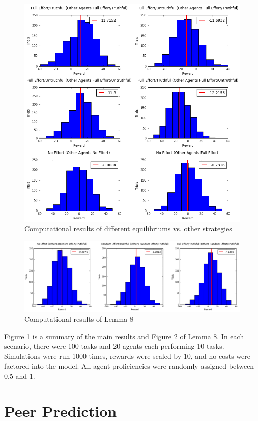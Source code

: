 \documentclass{scrartcl}
\begin{document}
\begin{figure}[H]
	\caption{Computational results of different equilibriums vs. other strategies}
	\centering
	\includegraphics[width=1.0\textwidth]{cs_equilibriums}
\end{figure}
\begin{figure}[H]
	\caption{Computational results of Lemma 8}
	\centering
	\includegraphics[width=1.0\textwidth]{cs_lemma8}
\end{figure}

Figure 1 is a summary of the main results and Figure 2 of Lemma 8. In each scenario, there were 100 tasks and 20 agents each performing 10 tasks. Simulations were run 1000 times, rewards were scaled by 10, and no costs were factored into the model. All agent proficiencies were randomly assigned between 0.5 and 1.

\section{Peer Prediction}
\end{document}
